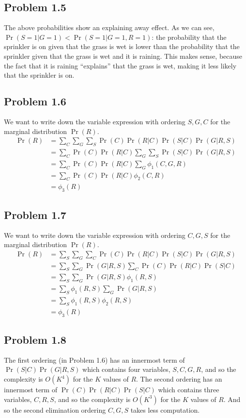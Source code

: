 \documentclass[submit]{harvardml}
\begin{document}
\subsection*{Problem 1.5}
The above probabilities show an explaining away effect. As we can see, $\Pr(S = 1 | G = 1) < \Pr(S = 1 | G = 1, R = 1)$: the probability that the sprinkler is on given that the grass is wet is lower than the probability that the sprinkler given that the grass is wet and it is raining. This makes sense, because the fact that it is raining ``explains'' that the grass is wet, making it less likely that the sprinkler is on.

\subsection*{Problem 1.6}
We want to write down the variable expression with ordering $S, G, C$ for the marginal distribution $\Pr(R)$.
\begin{align*}
    \Pr(R) &= \sum_{C} \sum_{G} \sum_{S} \Pr(C) \Pr(R | C) \Pr(S | C) \Pr(G | R, S)\\
    &= \sum_{C} \Pr(C) \Pr(R | C) \sum_{G} \sum_{S} \Pr(S | C) \Pr(G | R, S)\\
    &= \sum_{C} \Pr(C) \Pr(R | C) \sum_{G} \phi_1(C, G, R) \\
    &= \sum_{C} \Pr(C) \Pr(R | C) \phi_2(C, R) \\
    &= \phi_3(R)
\end{align*}

\subsection*{Problem 1.7}
We want to write down the variable expression with ordering $C, G, S$ for the marginal distribution $\Pr(R)$.
\begin{align*}
    \Pr(R) &= \sum_{S} \sum_{G} \sum_{C} \Pr(C) \Pr(R | C) \Pr(S | C) \Pr(G | R, S)\\
    &= \sum_{S} \sum_{G} \Pr(G | R, S) \sum_{C} \Pr(C) \Pr(R | C) \Pr(S | C) \\
    &= \sum_{S} \sum_{G} \Pr(G | R, S) \phi_1(R, S) \\
    &= \sum_{S} \phi_1(R, S) \sum_{G} \Pr(G | R, S) \\
    &= \sum_{S} \phi_1(R, S) \phi_2(R, S) \\
    &= \phi_3(R)
\end{align*}

\subsection*{Problem 1.8}
The first ordering (in Problem 1.6) has an innermost term of $\Pr(S|C) \Pr(G | R, S)$ which contains four variables, $S, C, G, R$, and so the complexity is $O(K^4)$ for the $K$ values of $R$. The second ordering has an innermost term of $\Pr(C)\Pr(R | C) \Pr(S | C)$ which contains three variables, $C, R, S$, and so the complexity is $O(K^3)$ for the $K$ values of $R$. And so the second elimination ordering $C, G, S$ takes less computation.
\end{document}
